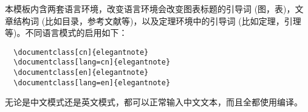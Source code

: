 本模板内含两套语言环境，改变语言环境会改变图表标题的引导词 (图，表)，文章结构词 (比如目录，参考文献等)，以及定理环境中的引导词 (比如定理，引理等)。不同语言模式的启用如下：

\begin{verbatim} 
  \documentclass[cn]{elegantnote} 
  \documentclass[lang=cn]{elegantnote} 
  \documentclass[en]{elegantnote} 
  \documentclass[lang=en]{elegantnote}
\end{verbatim}

\begin{note}
  无论是中文模式还是英文模式，都可以正常输入中文文本，而且全都使用编译。
\end{note}